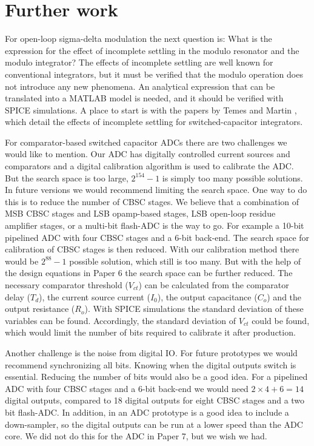 \section{Further work}


For open-loop sigma-delta modulation the next question is:
What is the expression for the  effect of incomplete settling in the modulo resonator and
the modulo integrator? The effects of incomplete settling are well
known for conventional integrators, but it must be verified that the
modulo operation does not introduce any new phenomena. An analytical expression that can be translated
into a MATLAB model is needed, and it should be verified with SPICE
simulations. A place to start is with the papers by Temes \cite{temes80}
and Martin \cite{martin81}, which detail the effects of incomplete settling for
switched-capacitor integrators. 


For comparator-based switched capacitor ADCs there are two challenges we
would like to mention. 
Our ADC has digitally controlled current sources and comparators and a
digital calibration algorithm is used to calibrate the ADC. But the search
space is too large, $2^{154}-1$ is simply too many possible solutions. In
future versions we would recommend limiting the search space. One way to
do this is to reduce the number of CBSC stages. We believe that a
combination of MSB CBSC stages and LSB opamp-based stages, LSB open-loop
residue amplifier stages, or a multi-bit flash-ADC is the way to go. For
example a 10-bit pipelined ADC with four CBSC stages and a 6-bit
back-end. The search space for calibration of CBSC
stages is then reduced. With our calibration method there would be
$2^{88}-1$ possible solution,
which still is too many. But with the help of the design equations in
Paper 6 the search space can be further reduced. The necessary
comparator threshold ($V_{ct}$) can be calculated from the comparator delay ($T_d$), the
current source current ($I_0$), the output capacitance ($C_o$) and the
output resistance ($R_o$). With SPICE simulations the standard deviation of
these variables can be found. Accordingly, the standard deviation of $V_{ct}$
could be found, which would limit the number of bits required to
calibrate it after production.


Another challenge is the noise from digital IO. For future prototypes
we would recommend synchronizing all bits. Knowing when the digital
outputs switch is essential. Reducing the number of bits would also
be a good idea. For a pipelined ADC with four CBSC stages and a 6-bit back-end we would
need $2\times4 + 6
= 14$ digital outputs, compared to 18 digital outputs for eight CBSC stages and a two
bit flash-ADC. In addition, in an ADC prototype is a good idea to include a down-sampler, so the digital
outputs can be run at a lower speed than the ADC core. We did not do
this for the ADC in Paper 7, but we wish we had. 







